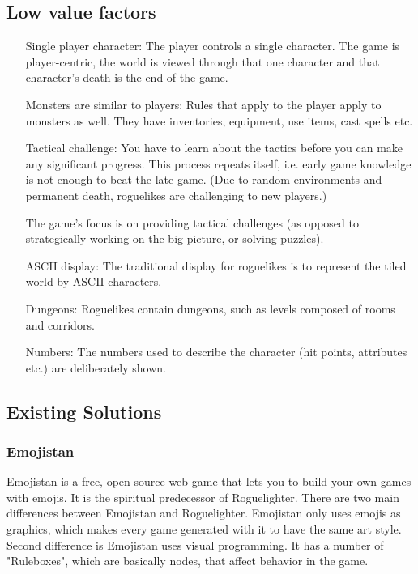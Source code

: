 \documentclass{article}
\begin{document}
\subsection*{Low value factors} 
\begin{itemize}
    \item[Single player character:]
    The player controls a single character. The game is player-centric, 
    the world is viewed through that one character and that character's 
    death is the end of the game. 
    
    \item[Monsters are similar to players:]
    Rules that apply to the player apply to monsters as well. They have 
    inventories, equipment, use items, cast spells etc. 
    
    \item[Tactical challenge:]
    You have to learn about the tactics before you can make any 
    significant progress. This process repeats itself, i.e. early game 
    knowledge is not enough to beat the late game. (Due to random 
    environments and permanent death, roguelikes are challenging to new 
    players.) 
    
    The game's focus is on providing tactical challenges (as opposed to 
    strategically working on the big picture, or solving puzzles). 
    
    \item[ASCII display:]
    The traditional display for roguelikes is to represent the tiled world 
    by ASCII characters. 
    
    \item[Dungeons:]
    Roguelikes contain dungeons, such as levels composed of rooms and 
    corridors. 
    
    \item[Numbers:]
    The numbers used to describe the character (hit points, attributes 
    etc.) are deliberately shown. 
\end{itemize}

\subsection{Existing Solutions}
\subsubsection{Emojistan}
Emojistan is a free, open-source web game that lets you to build your own games with emojis. It is the spiritual predecessor of Roguelighter. There are two main differences between Emojistan and Roguelighter. Emojistan only uses emojis as graphics, which makes every game generated with it to have the same art style. Second difference is Emojistan uses visual programming. It has a number of "Ruleboxes", which are basically nodes, that affect behavior in the game.
\end{document}
